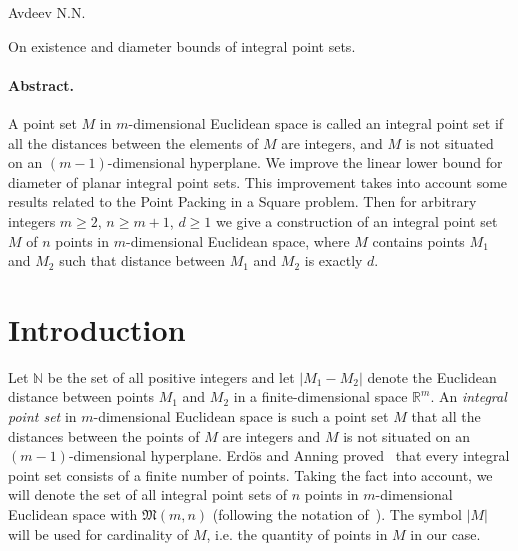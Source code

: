 \documentclass[a4paper,14pt]{article} %
\theoremstyle{plain}
\theoremstyle{definition}
\begin{document}
\renewcommand{\bibname}{Список цитированной литературы}
\renewcommand\refname{\bibname}

Avdeev N.N.

On existence and diameter bounds of integral point sets.

\paragraph{Abstract.}
A point set $M$ in $m$-dimensional Euclidean space is called an integral point set if all the distances between the
elements of $M$ are integers, and $M$ is not situated on an $(m-1)$-dimensional hyperplane.
We improve the linear lower bound for diameter of planar integral point sets.
This improvement takes into account some results related to the Point Packing in a Square problem.
Then for arbitrary integers $m \geq 2$, $n \geq m+1$, $d \geq 1$
we give a construction of an integral point set $M$ of $n$ points in $m$-dimensional Euclidean space,
where $M$ contains points $M_1$ and $M_2$ such that distance between $M_1$ and $M_2$ is exactly $d$.



\section{Introduction}
Let $\mathbb{N}$ be the set of all positive integers and let $|M_1 - M_2|$ denote the Euclidean distance
between points $M_1$ and $M_2$ in a finite-dimensional space $\mathbb{R}^m$.
An \textit{integral point set} in $m$-dimensional Euclidean space is such a point set $M$ that all the distances between the
points of $M$ are integers and $M$ is not situated on an $(m-1)$-dimensional hyperplane.
Erd\"os and Anning proved~\cite{anning1945integral,erdos1945integral} that every integral point set consists of a finite number of points.
Taking the fact into account, we will denote the set of all integral point sets of $n$ points in $m$-dimensional Euclidean space with
$\mathfrak{M}(m,n)$ (following the notation of~\cite{our-vmmsh-2018}).
The symbol $|M|$ will be used for cardinality of $M$, i.e. the quantity of points in $M$ in our case.
\end{document}
